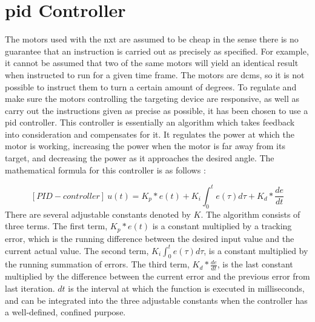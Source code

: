 \section{\acrlong{pid} Controller}
\label{ss:pid}
The motors used with the \gls{nxt} are assumed to be cheap in the sense there is no guarantee that an instruction is carried out as precisely as specified. For example, it cannot be assumed that two of the same motors will yield an identical result when instructed to run for a given time frame. The motors are \glspl{dcm}, so it is not possible to instruct them to turn a certain amount of degrees.
To regulate and make sure the motors controlling the targeting device are responsive, as well as carry out the instructions given as precise as possible, it has been chosen to use a \gls{pid} controller. This controller is essentially an algorithm which takes feedback into consideration and compensates for it. It regulates the power at which the motor is working, increasing the power when the motor is far away from its target, and decreasing the power as it approaches the desired angle.  
The mathematical formula for this controller is as follows \citep{pid_controller}:

\begin{equation} \label{pid_formula}
[PID-controller] \
u(t) = K_p *e(t) + K_i \int_0^t e(\tau)d\tau + K_d*
\frac{de}
     {dt}
\end{equation}
There are several adjustable constants denoted by $K$. The algorithm consists of three terms. The first term, $K_p*e(t)$ is a constant multiplied by a tracking error, which is the running difference between the desired input value and the current actual value. The second term, $K_i \int_0^t e(\tau)d\tau$, is a constant multiplied by the running summation of errors. The third term, $K_d* \frac{de}{dt}$, is the last constant multiplied by the difference between the current error and the previous error from last iteration. $dt$ is the interval at which the function is executed in milliseconds, and can be integrated into the three adjustable constants when the controller has a well-defined, confined purpose.

